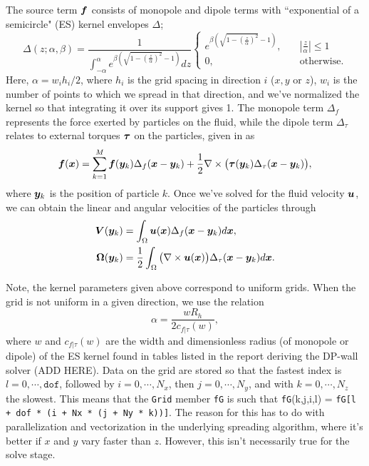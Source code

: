 The source term $\boldsymbol f$ consists of monopole and dipole terms with ``exponential of a semicircle" (ES) kernel \cite{barnett} envelopes $\Delta$;
\begin{equation}
\Delta(z;\alpha,\beta) = \displaystyle \frac{1}{\displaystyle \int_{-\alpha}^\alpha e^{\beta(\sqrt{1-(\frac{z}{\alpha})^2}-1)}dz} \begin{cases}
e^{\beta(\sqrt{1-(\frac{z}{\alpha})^2}-1)},\quad &|\frac{z}{\alpha}| \leq 1\\
0,\quad &\text{otherwise}.
\end{cases}
\end{equation}
Here, $\alpha = w_ih_i/2$, where $h_i$ is the grid spacing in direction $i$ ($x,y$ or $z$), $w_i$ is the number of points to which we spread in that direction, and we've normalized the kernel so that integrating it over its support gives 1. The monopole term $\Delta_f$ represents the force exerted by particles on the fluid, while the dipole term $\Delta_\tau$ relates to external torques $\boldsymbol \tau$ on the particles, given in \cite{lomholt} as
\begin{equation}\label{fcm}
\boldsymbol f(\boldsymbol x) = \displaystyle \sum_{k=1}^M \boldsymbol f(\boldsymbol y_k)\Delta_f(\boldsymbol x - \boldsymbol y_k) +\frac{1}{2}\nabla \times  \big(\boldsymbol{\tau}(\boldsymbol y_k)\Delta_\tau(\boldsymbol x - \boldsymbol y_k)\big) ,
\end{equation}
where $\boldsymbol y_k$ is the position of particle $k$. Once we've solved for the fluid velocity $\boldsymbol u$, we can obtain the linear and angular velocities of the particles through
\begin{align}
\boldsymbol V(\boldsymbol y_k) &= \displaystyle \int_\Omega \boldsymbol u(\boldsymbol x) \Delta_f(\boldsymbol x - \boldsymbol y_k)d\boldsymbol x,\label{getpartvels}\\
\boldsymbol \Omega(\boldsymbol y_k) &= \frac{1}{2}\displaystyle \int_\Omega \big(\nabla \times \boldsymbol u(\boldsymbol x)\big) \Delta_\tau(\boldsymbol x - \boldsymbol y_k)d\boldsymbol x\label{getpartvort}.
\end{align}

Note, the kernel parameters given above correspond to uniform grids. When the grid is not uniform in a given direction, we use the relation
\begin{equation}
\alpha = \frac{w R_h}{2 c_{f|\tau}(w)},
\end{equation}
where $w$ and $c_{f|\tau}(w)$ are the width and dimensionless radius (of monopole or dipole) of the ES kernel found in tables listed in the report deriving the DP-wall solver (ADD HERE).
Data on the grid are stored so that the fastest index is $l = 0,\cdots,\texttt{dof}$, followed by $i = 0,\cdots,N_x$, then $j = 0, \cdots, N_y$, and with $k = 0,\cdots ,N_z$ the slowest. This means that the \texttt{Grid} member \texttt{fG} is such that \texttt{fG}(k,j,i,l) = \texttt{fG[l + dof * (i + Nx * (j + Ny * k))]}.
The reason for this has to do with parallelization and vectorization in the underlying spreading algorithm, where it's better if $x$ and $y$ vary faster than $z$. However, this isn't necessarily true for the solve stage. 


